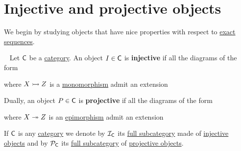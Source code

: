 \documentclass[../../main]{subfiles}
\begin{document}
\section{Injective and projective objects}

We begin by studying objects that have nice properties with respect to \hyperref[def:exact-sequence]{exact sequences}.
\begin{definition}\label{def:injective-projective-object}~
  Let \(\mathsf{C}\) be a \hyperref[def:category]{category}.
  An object \(I \in \mathsf{C}\) is \textbf{injective} if all the diagrams of the form
  \begin{center}
  \end{center}
  where \(X \rightarrowtail Z\) is a \hyperref[def:mono-epi-morphism]{monomorphism} admit an extension
  \begin{center}
  \end{center}

  Dually, an object \(P \in \mathsf{C}\) is \textbf{projective} if all the diagrams of the form
  \begin{center}
  \end{center}
  where \(X \twoheadrightarrow Z\) is an \hyperref[def:mono-epi-morphism]{epimorphism} admit an extension
  \begin{center}
  \end{center}
\end{definition}

\begin{notation}
  If \(\mathsf{C}\) is any \hyperref[def:category]{category} we denote by \(\mathcal{I}_{\mathsf{C}}\) its \hyperref[def:subcategory]{full subcategory} made of \hyperref[def:injective-projective-object]{injective objects} and by \(\mathcal{P}_{\mathsf{C}}\) its \hyperref[def:subcategory]{full subcategory} of \hyperref[def:injective-projective-object]{projective objects}.
\end{notation}
\end{document}

